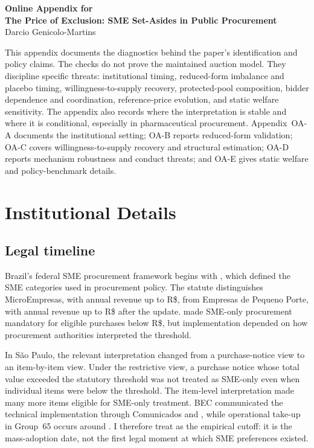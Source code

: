 \documentclass[12pt]{article}
\begin{document}
\begin{center}
{\Large \textbf{Online Appendix for}}\\[0.5em]
{\large \textbf{The Price of Exclusion: SME Set-Asides in Public Procurement}}\\[0.5em]
Darcio Genicolo-Martins
\end{center}

\noindent This appendix documents the diagnostics behind the paper's
identification and policy claims. The checks do not prove the maintained
auction model. They discipline specific threats: institutional timing,
reduced-form imbalance and placebo timing, willingness-to-supply recovery,
protected-pool composition, bidder dependence and coordination,
reference-price evolution, and static welfare sensitivity. The appendix
also records where the interpretation is stable and where it is
conditional, especially in pharmaceutical procurement. Appendix~OA-A
documents the institutional setting; OA-B reports reduced-form validation;
OA-C covers willingness-to-supply recovery and structural estimation; OA-D
reports mechanism robustness and conduct threats; and OA-E gives static
welfare and policy-benchmark details.

\appendix

\section{Institutional Details}

\subsection{Legal timeline}

Brazil's federal SME procurement framework begins with \LCSmeStatute, which
defined the SME categories used in procurement policy. The statute distinguishes
MicroEmpresas, with annual revenue up to R\$\MERevCeilingBRL, from Empresas de
Pequeno Porte, with annual revenue up to R\$\EPPRevCeilingBRL{} after the
\LCRevenueAct{} update. \LCSetAsideAct{} made SME-only procurement mandatory
for eligible purchases below R\$\setAsideThreshBRL, but implementation depended
on how procurement authorities interpreted the threshold.

In S\~ao Paulo, the relevant interpretation changed from a purchase-notice view
to an item-by-item view. Under the restrictive view, a purchase notice whose
total value exceeded the statutory threshold was not treated as SME-only even
when individual items were below the threshold. The item-level interpretation
made many more items eligible for SME-only treatment. BEC communicated the
technical implementation through Comunicados \comunicadoBECone{} and
\comunicadoBECtwo, while operational take-up in Group~65 occurs around
\policyCutoffMonth. I therefore treat \policyCutoffMonth{} as the empirical
cutoff: it is the mass-adoption date, not the first legal moment at which SME
preferences existed.
\end{document}
